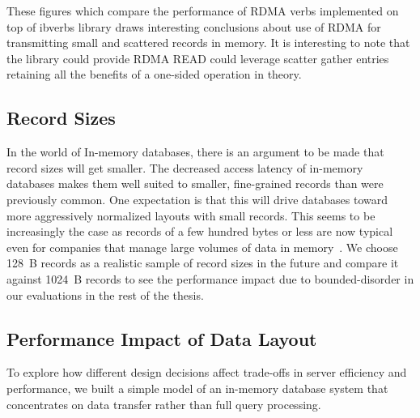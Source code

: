These figures which compare the performance of RDMA verbs implemented 
on top of ibverbs library draws interesting conclusions about use of RDMA for transmitting small and scattered records in memory. 
It is interesting to note that the library could provide RDMA READ could leverage scatter gather entries retaining all the benefits 
of a one-sided operation in theory.


\subsection{Record Sizes}
In the world of In-memory databases, there is an argument to be made that record sizes will get smaller.
The decreased access latency of in-memory databases makes them well suited to smaller, fine-grained records
than were previously common. One expectation is that this will drive databases
toward more aggressively normalized layouts with small records. This
seems to be increasingly the case as records of a few hundred bytes or less
are now typical even for companies that manage large volumes of data in memory~\cite{fb-memcache,fb-workload}. 
We choose 128~B records as a realistic sample of record sizes in the future and compare it against 
1024~B records to see the performance impact due to bounded-disorder in our evaluations in the rest of the thesis.



\subsection{Performance Impact of Data Layout}
\label{sec:zero-copy-tput}

%
To explore how different design decisions affect trade-offs in server efficiency and
performance, we built a simple model of an in-memory database system that
concentrates on data transfer rather than full query processing.

